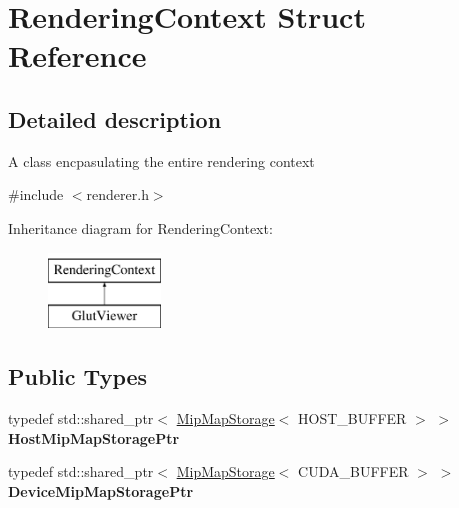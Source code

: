 \hypertarget{struct_rendering_context}{}\section{Rendering\+Context Struct Reference}
\label{struct_rendering_context}


\subsection{Detailed description}
A class encpasulating the entire rendering context 

{\ttfamily \#include $<$renderer.\+h$>$}

Inheritance diagram for Rendering\+Context\+:\begin{figure}[H]
\begin{center}
\leavevmode
\includegraphics[height=2.000000cm]{struct_rendering_context}
\end{center}
\end{figure}
\subsection*{Public Types}
\begin{DoxyCompactItemize}
\item 
\mbox{\label{struct_rendering_context_a9c9ba257dbaf58dad0d519804d1f85b0}} 
typedef std\+::shared\+\_\+ptr$<$ \hyperlink{struct_mip_map_storage}{Mip\+Map\+Storage}$<$ H\+O\+S\+T\+\_\+\+B\+U\+F\+F\+ER $>$ $>$ {\bfseries Host\+Mip\+Map\+Storage\+Ptr}
\item 
\mbox{\label{struct_rendering_context_aefc8ddb78fd8601f1fdc31d5058d8011}} 
typedef std\+::shared\+\_\+ptr$<$ \hyperlink{struct_mip_map_storage}{Mip\+Map\+Storage}$<$ C\+U\+D\+A\+\_\+\+B\+U\+F\+F\+ER $>$ $>$ {\bfseries Device\+Mip\+Map\+Storage\+Ptr}
\end{DoxyCompactItemize}
